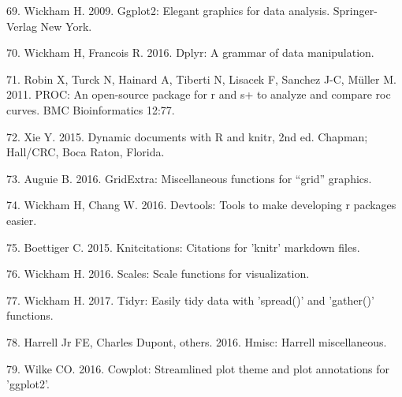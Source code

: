\documentclass[12pt,]{article}
\begin{document}
\hypertarget{ref-ggplot2}{}
69. Wickham H. 2009. Ggplot2: Elegant graphics for data analysis.
Springer-Verlag New York.

\hypertarget{ref-dplyr}{}
70. Wickham H, Francois R. 2016. Dplyr: A grammar of data manipulation.

\hypertarget{ref-pROC}{}
71. Robin X, Turck N, Hainard A, Tiberti N, Lisacek F, Sanchez J-C,
Müller M. 2011. PROC: An open-source package for r and s+ to analyze and
compare roc curves. BMC Bioinformatics 12:77.

\hypertarget{ref-knitr2015}{}
72. Xie Y. 2015. Dynamic documents with R and knitr, 2nd ed. Chapman;
Hall/CRC, Boca Raton, Florida.

\hypertarget{ref-gridExtra}{}
73. Auguie B. 2016. GridExtra: Miscellaneous functions for ``grid''
graphics.

\hypertarget{ref-devtools}{}
74. Wickham H, Chang W. 2016. Devtools: Tools to make developing r
packages easier.

\hypertarget{ref-knitcitations}{}
75. Boettiger C. 2015. Knitcitations: Citations for 'knitr' markdown
files.

\hypertarget{ref-scales}{}
76. Wickham H. 2016. Scales: Scale functions for visualization.

\hypertarget{ref-tidyr}{}
77. Wickham H. 2017. Tidyr: Easily tidy data with 'spread()' and
'gather()' functions.

\hypertarget{ref-Hmisc}{}
78. Harrell Jr FE, Charles Dupont, others. 2016. Hmisc: Harrell
miscellaneous.

\hypertarget{ref-cowplot}{}
79. Wilke CO. 2016. Cowplot: Streamlined plot theme and plot annotations
for 'ggplot2'.
\end{document}
